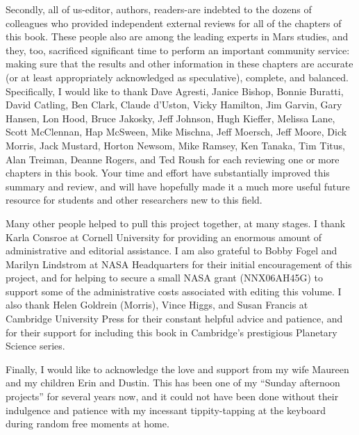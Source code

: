 \begin{acknowledgment}
Secondly, all of us-editor, authors, readers-are indebted to the dozens of colleagues who provided independent external reviews for all of the chapters of this book. These people also are among the leading experts in Mars studies, and they, too, sacrificed significant time to perform an important community service: making sure that the results and other information in these chapters are accurate (or at least appropriately acknowledged as speculative), complete, and balanced. Specifically, I would like to thank Dave Agresti, Janice Bishop, Bonnie Buratti, David Catling, Ben Clark, Claude d'Uston, Vicky Hamilton, Jim Garvin, Gary Hansen, Lon Hood, Bruce Jakosky, Jeff Johnson, Hugh Kieffer, Melissa Lane, Scott McClennan, Hap McSween, Mike Mischna, Jeff Moersch, Jeff Moore, Dick Morris, Jack Mustard, Horton Newsom, Mike Ramsey, Ken Tanaka, Tim Titus, Alan Treiman, Deanne Rogers, and Ted Roush for each reviewing one or more chapters in this book. Your time and effort have substantially improved this summary and review, and will have hopefully made it a much more useful future resource for students and other researchers new to this field.

Many other people helped to pull this project together, at many stages. I thank Karla Consroe at Cornell University for providing an enormous amount of administrative and editorial assistance. I am also grateful to Bobby Fogel and Marilyn Lindstrom at NASA Headquarters for their initial encouragement of this project, and for helping to secure a small NASA grant (NNX06AH45G) to support some of the administrative costs associated with editing this volume. I also thank Helen Goldrein (Morris), Vince Higgs, and Susan Francis at Cambridge University Press for their constant helpful advice and patience, and for their support for including this book in Cambridge's prestigious Planetary Science series.

Finally, I would like to acknowledge the love and support from my wife Maureen and my children Erin and Dustin. This has been one of my ``Sunday afternoon projects'' for several years now, and it could not have been done without their indulgence and patience with my incessant tippity-tapping at the keyboard during random free moments at home.
\author{Ithaca, NY\hfill Jim Bell\break April, 2007}

\end{acknowledgment}
